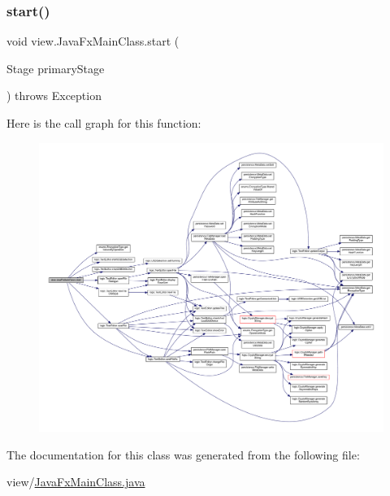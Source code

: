 \mbox{\label{classview_1_1_java_fx_main_class_a49da0dd068016aa12c36e77dee3f324e}} 
\subsubsection{\texorpdfstring{start()}{start()}}
{\footnotesize\ttfamily void view.\+Java\+Fx\+Main\+Class.\+start (\begin{DoxyParamCaption}\item[{Stage}]{primary\+Stage }\end{DoxyParamCaption}) throws Exception}

Here is the call graph for this function\+:\nopagebreak
\begin{figure}[H]
\begin{center}
\leavevmode
\includegraphics[width=350pt]{classview_1_1_java_fx_main_class_a49da0dd068016aa12c36e77dee3f324e_cgraph}
\end{center}
\end{figure}


The documentation for this class was generated from the following file\+:\begin{DoxyCompactItemize}
\item 
view/\mbox{\hyperlink{_java_fx_main_class_8java}{Java\+Fx\+Main\+Class.\+java}}\end{DoxyCompactItemize}
